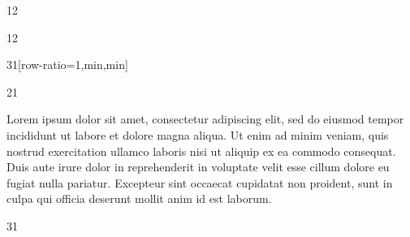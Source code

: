 \documentclass{ropas-poster}
\begin{document}
\begin{postergrid}{1}{2}
\begin{posterblock*}{1}{2}
\begin{postergrid}{3}{1}[row-ratio={1,min,min}]
        \begin{posterblock}{2}{1}

          Lorem ipsum dolor sit amet, consectetur adipiscing elit, sed do eiusmod tempor incididunt ut labore et dolore magna aliqua.
          Ut enim ad minim veniam, quis nostrud exercitation ullamco laboris nisi ut aliquip ex ea commodo consequat.
          Duis aute irure dolor in reprehenderit in voluptate velit esse cillum dolore eu fugiat nulla pariatur.
          Excepteur sint occaecat cupidatat non proident, sunt in culpa qui officia deserunt mollit anim id est laborum.
        \end{posterblock}

        \begin{posterblock}{3}{1}
        \end{posterblock}
      \end{postergrid}
    \end{posterblock*}
  \end{postergrid}
\end{document}
